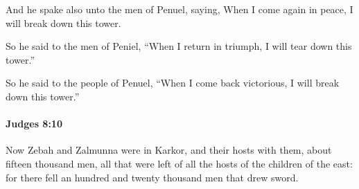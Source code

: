 			\begin{versebox}
					\item[BHS] 
					\item[ASV] And he spake also unto the men of Penuel, saying, When I come again in peace, I will break down this tower.
					\item[NIV] So he said to the men of Peniel, “When I return in triumph, I will tear down this tower.”
					\item[NRSV] So he said to the people of Penuel, “When I come back victorious, I will break down this tower.”
			\end{versebox}

		\paragraph{Judges 8:10} %
			\label{JUDGES-8-10}

			Now Zebah and Zalmunna were in Karkor, and their hosts with them, about fifteen thousand men, all that were left of all the hosts of the children of the east: for there fell an hundred and twenty thousand men that drew sword.

